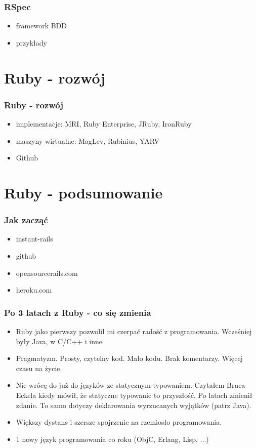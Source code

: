 \documentclass[12t]{beamer}
\begin{document}
\begin{frame}
  \frametitle{RSpec}
  \begin{itemize}
  \item framework BDD
  \item przykłady
  \end{itemize}
\end{frame}

\section{Ruby - rozwój}
\begin{frame}
  \frametitle{Ruby - rozwój}
  \begin{itemize}
  \item implementacje: MRI, Ruby Enterprise, JRuby, IronRuby
  \item maszyny wirtualne: MagLev, Rubinius, YARV
  \item Github
  \end{itemize}
\end{frame}

\section{Ruby - podsumowanie}
\begin{frame}
  \frametitle{Jak zacząć}
  \begin{itemize}
  \item instant-rails
  \item github
  \item opensourcerails.com
  \item heroku.com
  \end{itemize}
\end{frame}

\begin{frame}
  \frametitle{Po 3 latach z Ruby - co się zmienia}
  \begin{itemize}
  \item Ruby jako pierwszy pozwolił mi czerpać radość z
    programowania. Wcześniej były Java, w C/C++ i inne
  \item Pragmatyzm. Prosty, czytelny kod. Mało kodu. Brak
    komentarzy. Więcej czasu na życie.
  \item Nie wrócę do już do języków ze statycznym typowaniem. Czytałem
    Bruca Eckela kiedy mówił, że statyczne typowanie to przyszłość. Po
    latach zmienił zdanie. To samo dotyczy deklarowania wyrzucanych
    wyjątków (patrz Java).
  \item Większy dystans i szersze spojrzenie na rzemiosło programowania.
  \item 1 nowy język programowania co roku (ObjC, Erlang, Lisp, ...)
  \end{itemize}
\end{frame}
\end{document}
